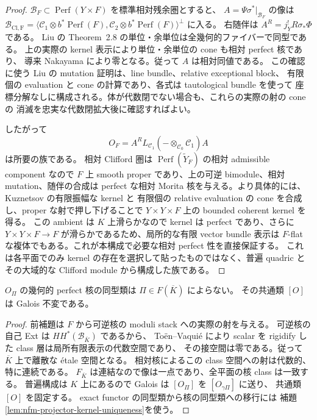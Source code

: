 \begin{proof}
$\mathcal B_F\subset\operatorname{Perf}(Y\times F)$ を標準相対残余圏とすると、
$A=\Psi\sigma^*|_{\mathcal B_F}$ の像は
$\mathcal B_{\mathrm{Cl,F}}=\langle\mathcal C_1\otimes b^*\operatorname{Perf}(F),
\mathcal C_2\otimes b^*\operatorname{Perf}(F)\rangle^\perp$ に入る。
右随伴は $A^R=j_Y^!R\sigma_*\Phi$ である。
Liu の Theorem~2.8 の単位・余単位は全幾何的ファイバーで同型である。
上の実際の kernel 表示により単位・余単位の cone も相対 perfect 核であり、
導来 Nakayama により零となる。従って $A$ は相対同値である。
この確認に使う Liu の mutation 証明は、line bundle、relative exceptional block、
有限個の evaluation と cone の計算であり、各式は tautological bundle を使って
座標分解なしに構成される。体が代数閉でない場合も、これらの実際の射の cone の
消滅を忠実な代数閉拡大後に確認すればよい。

したがって
\[
 O_F=A^R L_{\mathcal C_1}
       (-\otimes_{\mathcal C_0}\mathcal C_1)A
\]
は所要の族である。
相対 Clifford 圏は $\operatorname{Perf}(\widetilde Y_F)$ の相対 admissible component
なので $F$ 上 smooth proper であり、上の可逆 bimodule、相対 mutation、随伴の合成は
perfect な相対 Morita 核を与える。より具体的には、Kuznetsov の有限振幅な kernel と
有限個の relative evaluation の cone を合成し、proper な射で押し下げることで
$Y\times Y\times F$ 上の bounded coherent kernel を得る。
この ambient は $K$ 上滑らかなので kernel は perfect であり、さらに
$Y\times Y\times F\to F$ が滑らかであるため、局所的な有限 vector bundle 表示は
$F$-flat な複体でもある。これが本構成で必要な相対 perfect 性を直接保証する。
これは各平面でのみ kernel の存在を選択して貼ったものではなく、普遍 quadric と
その大域的な Clifford module から構成した族である。
\end{proof}

\begin{proposition}
\label{prop:nfm-fivefold-half-rotation-plane-independent}
$O_\Pi$ の幾何的 perfect 核の同型類は $\Pi\in F(\overline K)$ によらない。
その共通類 $[O]$ は Galois 不変である。
\end{proposition}

\begin{proof}
前補題は $F$ から可逆核の moduli stack への実際の射を与える。
可逆核の自己 Ext は $HH^*(\mathcal B_{\overline K})$ であるから、
To\"en--Vaqui\'e\cite[Corollaries~3.17, 3.22, 3.24]{NFMToenVaquieModuli}
により scalar を rigidify した class 層は局所有限表示の代数空間であり、
その接空間は零である。従って $\overline K$ 上で離散な \'etale 空間となる。
相対核によるこの class 空間への射は代数的、特に連続である。
$F_{\overline K}$ は連結なので像は一点であり、全平面の核 class は一致する。
普遍構成は $K$ 上にあるので Galois は $[O_\Pi]$ を $[O_{\gamma\Pi}]$ に送り、
共通類 $[O]$ を固定する。
exact functor の同型類から核の同型類への移行には
補題\ref{lem:nfm-projector-kernel-uniqueness}を使う。
\end{proof}


